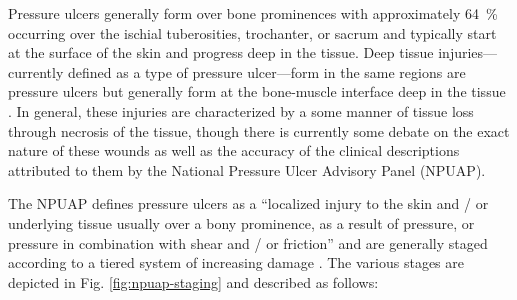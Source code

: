 		Pressure ulcers generally form over bone prominences with approximately \SI{64}{\percent} occurring over the ischial tuberosities, trochanter, or sacrum \cite{garber03} and typically start at the surface of the skin and progress deep in the tissue. Deep tissue injuries---currently defined as a type of pressure ulcer---form in the same regions are pressure ulcers but generally form at the bone-muscle interface deep in the tissue \cite{kanno09}. In general, these injuries are characterized by a some manner of tissue loss through necrosis of the tissue, though there is currently some debate on the exact nature of these wounds as well as the accuracy of the clinical descriptions attributed to them by the National Pressure Ulcer Advisory Panel (NPUAP).

		The NPUAP defines pressure ulcers as a ``localized injury to the skin and / or underlying tissue usually over a bony prominence, as a result of pressure, or pressure in combination with shear and / or friction'' and are generally staged according to a tiered system of increasing damage \cite{npuap07}. The various stages are depicted in Fig. \ref{fig:npuap-staging} and described as follows:

